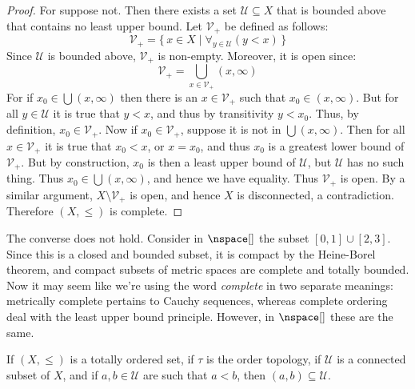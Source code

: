 \documentclass{article}                                                        %
\begin{document}
        \begin{proof}
            For suppose not. Then there exists a set
            $\mathcal{U}\subseteq{X}$ that is bounded above that contains
            no least upper bound. Let $\mathcal{V}_{+}$ be defined as
            follows:
            \begin{equation}
                \mathcal{V}_{+}=\{\,x\in{X}\;|\;
                    \forall_{y\in\mathcal{U}}(y<x)\,\}
            \end{equation}
            Since $\mathcal{U}$ is bounded above, $\mathcal{V}_{+}$ is
            non-empty. Moreover, it is open since:
            \begin{equation}
                \mathcal{V}_{+}=
                \bigcup_{x\in\mathcal{V}_{+}}(x,\infty)
            \end{equation}
            For if $x_{0}\in\bigcup(x,\infty)$ then there is an
            $x\in\mathcal{V}_{+}$ such that $x_{0}\in(x,\infty)$. But
            for all $y\in\mathcal{U}$ it is true that $y<x$, and thus by
            transitivity $y<x_{0}$. Thus, by definition,
            $x_{0}\in\mathcal{V}_{+}$. Now if $x_{0}\in\mathcal{V}_{+}$,
            suppose it is not in $\bigcup(x,\infty)$. Then for all
            $x\in\mathcal{V}_{+}$ it is true that $x_{0}<x$, or $x=x_{0}$,
            and thus $x_{0}$ is a greatest lower bound of $\mathcal{V}_{+}$.
            But by construction, $x_{0}$ is then a least upper bound of
            $\mathcal{U}$, but $\mathcal{U}$ has no such thing. Thus
            $x_{0}\in\bigcup(x,\infty)$, and hence we have equality.
            Thus $\mathcal{V}_{+}$ is open. By a similar argument,
            ${X}\setminus\mathcal{V}_{+}$ is open, and hence $X$ is
            disconnected, a contradiction. Therefore $(X,\leq)$ is complete.
        \end{proof}
        The converse does not hold. Consider in $\nspace[]$ the subset
        $[0,1]\cup[2,3]$. Since this is a closed and bounded subset, it is
        compact by the Heine-Borel theorem, and compact subsets of metric spaces
        are complete and totally bounded. Now it may seem like we're using the
        word \textit{complete} in two separate meanings: metrically complete
        pertains to Cauchy sequences, whereas complete ordering deal with the
        least upper bound principle. However, in $\nspace[]$ these are the same.
        \begin{theorem}
                If $(X,\leq)$ is a totally ordered set, if $\tau$ is the order
                topology, if $\mathcal{U}$ is a connected subset of $X$, and if
                $a,b\in\mathcal{U}$ are such that $a<b$, then
                $(a,b)\subseteq\mathcal{U}$.
        \end{theorem}
\end{document}

